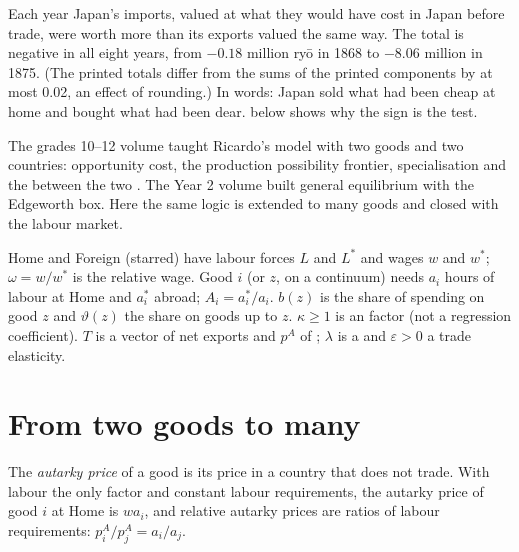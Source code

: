 Each year Japan's imports, valued at what they would have cost in Japan
before trade, were worth more than its exports valued the same way. The
total is negative in all eight years, from $-0.18$ million ryō in 1868 to $-8.06$
million in 1875. %
(The printed totals differ from the sums of the printed components by at most
0.02, an effect of rounding.) In words: Japan sold what had been cheap at home
and bought what had been dear.  below shows
why the sign is the test.

\begin{recall}
The grades 10--12 volume taught Ricardo's model with two goods and two
countries: opportunity cost, the production possibility frontier,
specialisation and the  between the two . The Year 2
volume built general equilibrium with the Edgeworth box. Here the same logic is
extended to many goods and closed with the labour market.
\end{recall}

\begin{notation}\label{not:b3:ricardian-trade:symbols}
Home and Foreign (starred) have labour forces $L$ and $L^*$ and wages $w$ and
$w^*$; $\omega = w/w^*$ is the relative wage. Good $i$ (or $z$, on a continuum)
needs $a_i$ hours of labour at Home and $a_i^*$ abroad; $A_i = a_i^*/a_i$. $b(z)$ is
the share of spending on good $z$ and $\vartheta(z)$ the share on goods up to $z$.
$\kappa \ge 1$ is an  factor (not a regression coefficient). $T$ is a vector
of net exports and $p^A$ of ; $\lambda$ is a  and $\varepsilon > 0$ a trade elasticity.
\end{notation}

\section{From two goods to many}\label{sec:b3:ricardian-trade:chain}

\begin{definition}\label{def:b3:ricardian-trade:autarky}
The \emph{autarky price} of a good is its price in a country that does not
trade. With labour the only factor and constant labour requirements, the
autarky price of good $i$ at Home is $w a_i$, and relative autarky prices are
ratios of labour requirements: $p^A_i/p^A_j = a_i/a_j$.
\end{definition}

